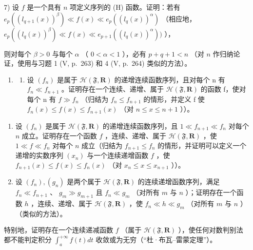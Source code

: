 7) 设 \(f\) 是一个具有 \(n\) 项定义序列的 (H) 函数。证明：若有 \(e_p((l_{q+1}(x))^{\beta}) \ll f(x) \ll e_p((l_q(x))^{\alpha})\) （相应地， \(e_p((l_q(x))^{\beta}) \ll f(x) \ll e_{p+1}((l_q(x))^{\alpha}))\) ），

则对每个 \(\beta > 0\) 与每个 \(\alpha\) （ \(0 < \alpha < 1\) ），必有 \(p + q + 1 < n\) （对 \(n\) 作归纳论证，使用与习题 1 (V, p.~263) 和 4 (V, p.~264) 类似的方法）。

\begin{enumerate}
\def\labelenumi{\arabic{enumi})}
\setcounter{enumi}{7}
\tightlist
\item
  \begin{enumerate}
  \def\labelenumii{\alph{enumii})}
  \tightlist
  \item
    设 \((f_{n})\) 是属于 \(\mathcal{H}(\mathfrak{F},\mathbf{R})\) 的递增连续函数序列，且对每个 n 有 \(f_{n} \ll f_{n+1}\) 。证明存在一个连续、递增、属于 \(\mathcal{H}(\mathfrak{F},\mathbf{R})\) 的函数 f，使对每个 n 有 \(f \gg f_{n}\) （归结为 \(f_{n} \leqslant f_{n+1}\) 的情形，并定义 f 使 \(f_{n}(x) \leqslant f(x) \leqslant f_{n+1}(x)\) （对 \(n \leqslant x \leqslant n+1\) ））。
  \end{enumerate}
\end{enumerate}

\begin{enumerate}
\def\labelenumi{\alph{enumi})}
\setcounter{enumi}{1}
\item
  设 \((f_n)\) 是属于 \(\mathcal{H}(\mathfrak{F},\mathbf{R})\) 的递增连续函数序列，且 \(1\ll f_{n + 1}\ll f_n\) 对每个 \(n\) 成立。证明存在一个函数 \(f\) ，连续、递增、属于 \(\mathcal{H}(\mathfrak{F},\mathbf{R})\) ，使 \(1\ll f\ll f_n\) 对每个 \(n\) 成立（归结为 \(f_{n + 1}\leqslant f_n\) 的情形，并证明可以定义一个递增的实数序列 \((x_{n})\) 与一个连续递增函数 \(f\) ，使 \(f_{n + 1}(x)\leqslant f(x)\leqslant f_n(x)\) （对 \(x_{n}\leqslant x\leqslant x_{n + 1}\) ））。
\item
  设 \((f_n), (g_n)\) 是两个属于 \(\mathcal{H}(\mathfrak{F}, \mathbf{R})\) 的连续递增函数序列，满足 \(f_n \ll f_{n+1}\) 、 \(g_m \gg g_{m+1}\) 且 \(f_n \ll g_m\) （对所有 \(m\) 与 \(n\) ）；证明存在一个函数 \(h\) ，连续、递增、属于 \(\mathcal{H}(\mathfrak{F}, \mathbf{R})\) ，使 \(f_n \ll h \ll g_m\) （对所有 \(m\) 与 \(n\) ）（类似的方法）。
\end{enumerate}

特别地，证明存在一个连续递减函数 \(f\) （属于 \(\mathcal{H}(\mathfrak{F},\mathbf{R})\) ），使任何对数判别法都不能判定积分 \(\int_{a}^{+\infty}f(t)dt\) 收敛或为无穷（“杜·布瓦–雷蒙定理”）。


